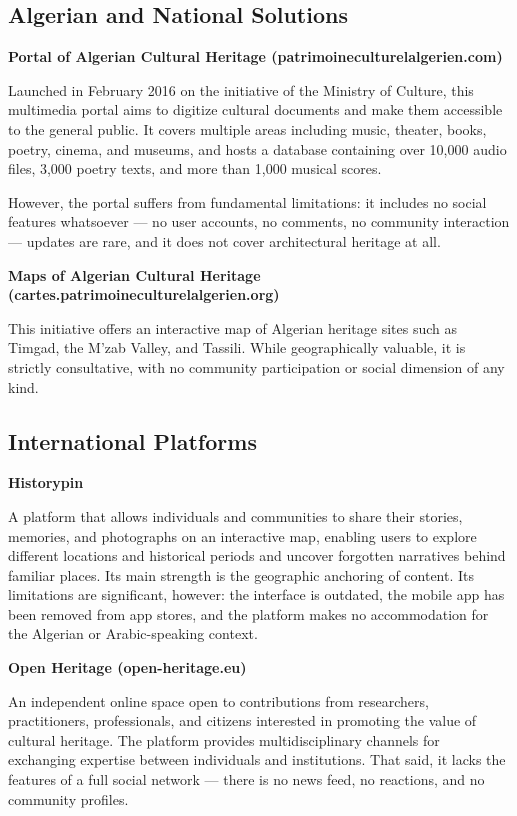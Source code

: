 \documentclass[12pt]{article}
\begin{document}
\subsection{Algerian and National Solutions}
\textbf{Portal of Algerian Cultural Heritage (patrimoineculturelalgerien.com)}

Launched in February 2016 on the initiative of the Ministry of Culture, this multimedia portal aims to digitize cultural documents and make them accessible to the general public. It covers multiple areas including music, theater, books, poetry, cinema, and museums, and hosts a database containing over 10,000 audio files, 3,000 poetry texts, and more than 1,000 musical scores.

However, the portal suffers from fundamental limitations: it includes no social features whatsoever — no user accounts, no comments, no community interaction — updates are rare, and it does not cover architectural heritage at all.

\textbf{Maps of Algerian Cultural Heritage (cartes.patrimoineculturelalgerien.org)}

This initiative offers an interactive map of Algerian heritage sites such as Timgad, the M'zab Valley, and Tassili. While geographically valuable, it is strictly consultative, with no community participation or social dimension of any kind.

\subsection{ International Platforms}
\textbf{Historypin}

A platform that allows individuals and communities to share their stories, memories, and photographs on an interactive map, enabling users to explore different locations and historical periods and uncover forgotten narratives behind familiar places. Its main strength is the geographic anchoring of content. Its limitations are significant, however: the interface is outdated, the mobile app has been removed from app stores, and the platform makes no accommodation for the Algerian or Arabic-speaking context.

\textbf{Open Heritage (open-heritage.eu)}

An independent online space open to contributions from researchers, practitioners, professionals, and citizens interested in promoting the value of cultural heritage. The platform provides multidisciplinary channels for exchanging expertise between individuals and institutions. That said, it lacks the features of a full social network — there is no news feed, no reactions, and no community profiles.
\end{document}
